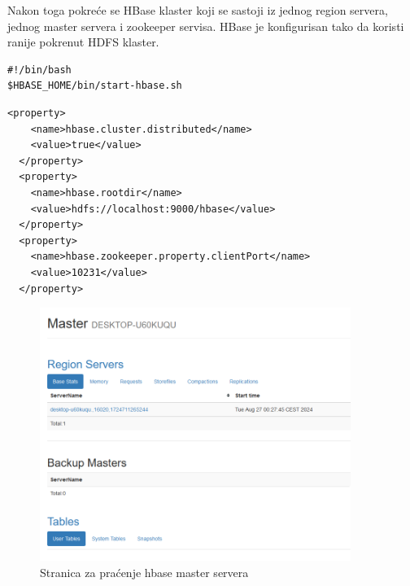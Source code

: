\documentclass[12pt,oneside]{memoir}
\begin{document}
Nakon toga pokreće se HBase klaster koji se sastoji iz jednog region servera, jednog master servera i zookeeper servisa. HBase je konfigurisan tako da koristi ranije pokrenut HDFS klaster.

\begin{lstlisting}[title={start-hbase.sh - Komanda za pokretanje HBase-a},captionpos=b]
#!/bin/bash
$HBASE_HOME/bin/start-hbase.sh
\end{lstlisting}

\pagebreak

\begin{lstlisting}[title={hbase-site.xml - Konfiguracija distribuiranog HBase-a},captionpos=b]
 <property>
    <name>hbase.cluster.distributed</name>
    <value>true</value>
  </property>
  <property>
    <name>hbase.rootdir</name>
    <value>hdfs://localhost:9000/hbase</value>
  </property>
  <property>
    <name>hbase.zookeeper.property.clientPort</name>
    <value>10231</value>
  </property>
\end{lstlisting}


\begin{figure}[!ht]
  \centering
  \includegraphics[width=0.9\textwidth]{hbase-master.png}
  \caption{Stranica za praćenje hbase master servera}
  \label{fig:grafikon}
\end{figure}

\pagebreak
\end{document}
